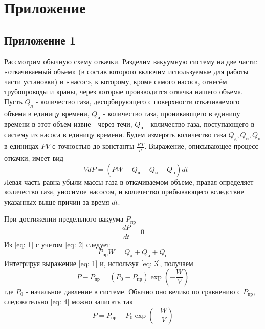 \section{Приложение}
\subsection{Приложение 1} \label{Приложение 1}
Рассмотрим обычную схему откачки. Разделим вакуумную систему на две части: «откачиваемый объем» (в состав которого включим используемые для работы части установки) и «насос», к которому, кроме самого насоса, отнесём трубопроводы и краны, через которые производится откачка нашего объема. Пусть $Q_\text{д}$ - количество газа, десорбирующего с поверхности откачиваемого объема в единицу времени, $Q_\text{и}$ - количество газа, проникающего в единицу времени в этот объем извне - через течи, $Q_\text{н}$ - количество газа, поступающего в систему из насоса в единицу времени. Будем измерять количество газа $Q_\text{д}, Q_\text{и}, Q_\text{н}$ в единицах $PV$ с точностью до константы $\frac{RT}{\mu}$. Выражение, описывающее процесс откачки, имеет вид
\begin{equation}
    -VdP = (PW - Q_\text{д} - Q_\text{и} - Q_\text{н})dt \label{eq: 1}
\end{equation}
Левая часть равна убыли массы газа в откачиваемом объеме, правая определяет количество газа, уносимое насосом, и количество прибывающего вследствие указанных выше причин за время $dt$.

При достижении предельного вакуума $P_\text{пр}$ 
\begin{equation}
    \frac{dP}{dt} = 0 \label{eq: 2}
\end{equation}
Из \eqref{eq: 1} с учетом \eqref{eq: 2} следует
\begin{equation}
    P_\text{пр} W = Q_\text{д} + Q_\text{и} + Q_\text{н} \label{eq: 3}
\end{equation}
Интегрируя выражение \eqref{eq: 1} и, используя \eqref{eq: 3}, получаем 
\begin{equation}
    P - P_\text{пр} = (P_0 - P_\text{пр})\exp({-\frac{W}{V}}) \label{eq: 4}
\end{equation}
где $P_0$ - начальное давление в системе. Обычно оно велико по сравнению с $P_\text{пр}$, следовательно \eqref{eq: 4} можно записать так
\begin{equation}
    P = P_\text{пр} + P_0\exp({-\frac{W}{V}}) \label{eq: 5}
\end{equation}

